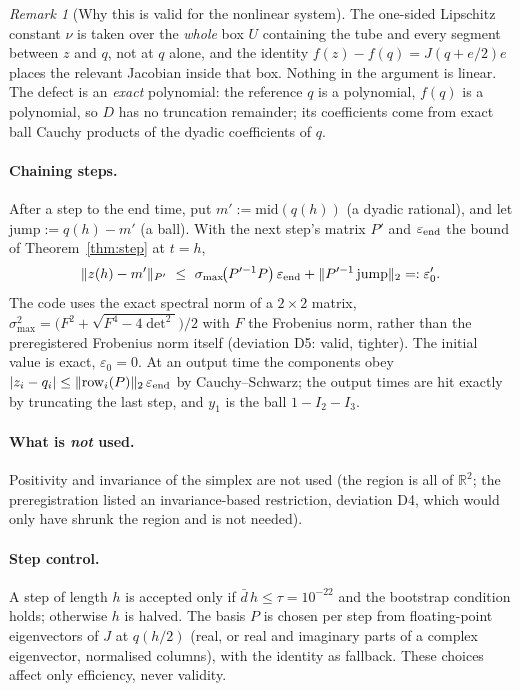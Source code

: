 \documentclass[11pt]{article}
\newcommand{\R}{\mathbb{R}}
\newcommand{\nrm}[1]{\lVert #1\rVert}
\theoremstyle{remark}
\newtheorem{rem}{Remark}
\begin{document}
\begin{rem}[Why this is valid for the nonlinear system]
The one-sided Lipschitz constant $\nu$ is taken over the \emph{whole} box $U$ containing the tube and every segment between $z$ and $q$, not at $q$ alone, and the identity $f(z)-f(q)=J(q+e/2)e$ places the relevant Jacobian inside that box. Nothing in the argument is linear. The defect is an \emph{exact} polynomial: the reference $q$ is a polynomial, $f(q)$ is a polynomial, so $D$ has no truncation remainder; its coefficients come from exact ball Cauchy products of the dyadic coefficients of $q$.
\end{rem}

\paragraph{Chaining steps.} After a step to the end time, put $m':=\mathrm{mid}(q(h))$ (a dyadic rational), and let $\mathrm{jump}:=q(h)-m'$ (a ball). With the next step's matrix $P'$ and $\varepsilon_{\rm end}$ the bound of Theorem~\ref{thm:step} at $t=h$,
\[
\nrm{z(h)-m'}_{P'}\ \le\ \sigma_{\max}\!\big(P'^{-1}P\big)\,\varepsilon_{\rm end}+\nrm{P'^{-1}\,\mathrm{jump}}_2=:\varepsilon_0'.
\]
The code uses the exact spectral norm of a $2\times2$ matrix, $\sigma_{\max}^2=\big(F^2+\sqrt{F^4-4\det^2}\big)/2$ with $F$ the Frobenius norm, rather than the preregistered Frobenius norm itself (deviation D5: valid, tighter). The initial value is exact, $\varepsilon_0=0$. At an output time the components obey $|z_i-q_i|\le\nrm{\mathrm{row}_i(P)}_2\,\varepsilon_{\rm end}$ by Cauchy--Schwarz; the output times are hit exactly by truncating the last step, and $y_1$ is the ball $1-I_2-I_3$.

\paragraph{What is \emph{not} used.} Positivity and invariance of the simplex are not used (the region is all of $\R^2$; the preregistration listed an invariance-based restriction, deviation D4, which would only have shrunk the region and is not needed).

\paragraph{Step control.} A step of length $h$ is accepted only if $\bar d\,h\le\tau=10^{-22}$ and the bootstrap condition holds; otherwise $h$ is halved. The basis $P$ is chosen per step from floating-point eigenvectors of $J$ at $q(h/2)$ (real, or real and imaginary parts of a complex eigenvector, normalised columns), with the identity as fallback. These choices affect only efficiency, never validity.
\end{document}
